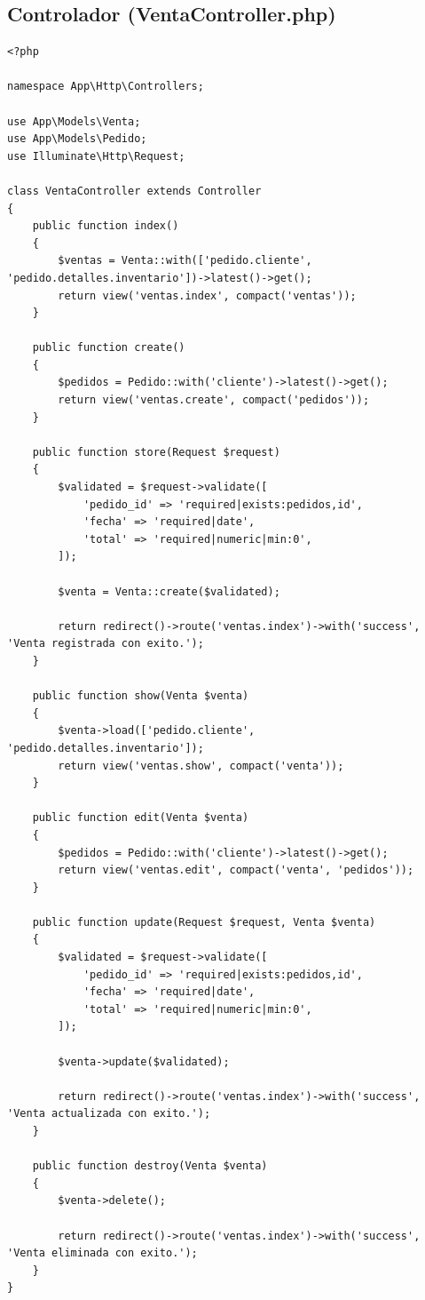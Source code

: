\documentclass[12pt, letterpaper]{article}
\begin{document}
\subsection{Controlador (VentaController.php)}
\begin{lstlisting}[language=purePHP]
<?php

namespace App\Http\Controllers;

use App\Models\Venta;
use App\Models\Pedido;
use Illuminate\Http\Request;

class VentaController extends Controller
{
    public function index()
    {
        $ventas = Venta::with(['pedido.cliente', 'pedido.detalles.inventario'])->latest()->get();
        return view('ventas.index', compact('ventas'));
    }

    public function create()
    {
        $pedidos = Pedido::with('cliente')->latest()->get();
        return view('ventas.create', compact('pedidos'));
    }

    public function store(Request $request)
    {
        $validated = $request->validate([
            'pedido_id' => 'required|exists:pedidos,id',
            'fecha' => 'required|date',
            'total' => 'required|numeric|min:0',
        ]);

        $venta = Venta::create($validated);

        return redirect()->route('ventas.index')->with('success', 'Venta registrada con exito.');
    }

    public function show(Venta $venta)
    {
        $venta->load(['pedido.cliente', 'pedido.detalles.inventario']);
        return view('ventas.show', compact('venta'));
    }

    public function edit(Venta $venta)
    {
        $pedidos = Pedido::with('cliente')->latest()->get();
        return view('ventas.edit', compact('venta', 'pedidos'));
    }

    public function update(Request $request, Venta $venta)
    {
        $validated = $request->validate([
            'pedido_id' => 'required|exists:pedidos,id',
            'fecha' => 'required|date',
            'total' => 'required|numeric|min:0',
        ]);

        $venta->update($validated);

        return redirect()->route('ventas.index')->with('success', 'Venta actualizada con exito.');
    }

    public function destroy(Venta $venta)
    {
        $venta->delete();

        return redirect()->route('ventas.index')->with('success', 'Venta eliminada con exito.');
    }
}
\end{lstlisting}
\end{document}
